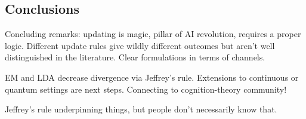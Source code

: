 \subsection*{Conclusions}

Concluding remarks: updating is magic, pillar of AI revolution, requires a proper
logic.
Different update rules give wildly different outcomes but aren't well distinguished in
the literature.
Clear formulations in terms of channels.

EM and LDA decrease divergence via Jeffrey's rule.
Extensions to continuous or quantum settings are next steps.
Connecting to cognition-theory community!

Jeffrey's rule underpinning things, but people don't necessarily know that.
